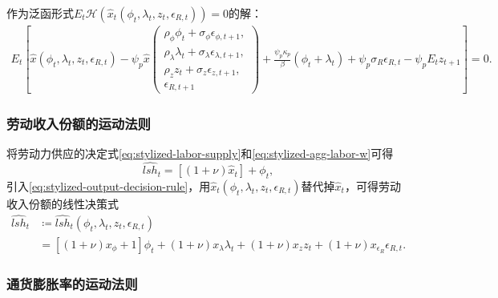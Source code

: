 作为泛函形式$E_{t} \mathcal{H} \left( \hat{x}_{t} \left( \phi_{t}, \lambda_{t}, z_{t}, \epsilon_{R,t} \right) \right) = 0$的解：
\begin{equation}
  \label{eq:stylized-output-functional-h}
\begin{split}
E_{t}
\left[
\hat{x} \left( \phi_{t}, \lambda_{t}, z_{t}, \epsilon_{R,t} \right)
- \psi_{p} \hat{x}
\begin{pmatrix}
  \rho_{\phi} \phi_{t} + \sigma_{\phi} \epsilon_{\phi, t+1}, \\
  \rho_{\lambda} \lambda_{t} + \sigma_{\lambda} \epsilon_{\lambda, t+1}, \\
  \rho_{z} z_{t} + \sigma_{z} \epsilon_{z,t+1}, \\
  \epsilon_{R,t+1}
\end{pmatrix}
+
\frac{\psi_{p} \kappa_{p}}{\beta} \left( \phi_{t} + \lambda_{t} \right)
+ \psi_{p} \sigma_{R} \epsilon_{R,t}
- \psi_{p} E_{t} z_{t+1}
\right] =0.
\end{split}
\end{equation}

\subsubsection{劳动收入份额的运动法则}
\label{sec:stylized-solution-lsh}
将劳动力供应的决定式\eqref{eq:stylized-labor-supply}和\eqref{eq:stylized-agg-labor-w}可得
\begin{equation*}
  \widehat{lsh}_{t} = \left[ \left( 1 + \nu \right) \hat{x}_{t} \right] + \phi_{t},
\end{equation*}
引入\eqref{eq:stylized-output-decision-rule}，用$\hat{x}_{t} \left( \phi_{t}, \lambda_{t}, z_{t}, \epsilon_{R,t} \right)$替代掉$\hat{x}_{t}$，可得劳动收入份额的线性决策式
\begin{equation}
  \label{eq:stylized-labor-share-decision-rule}
\begin{split}
  \widehat{lsh}_{t}  & \coloneqq \widehat{lsh}_{t} \left( \phi_{t}, \lambda_{t}, z_{t}, \epsilon_{R,t} \right) \\
  & = \left[ \left( 1 + \nu \right) x_{\phi} + 1 \right] \phi_{t}
  + \left( 1 + \nu \right) x_{\lambda} \lambda_{t}
  + \left( 1 + \nu \right) x_{z} z_{t}
  + \left( 1 + \nu \right) x_{\epsilon_{R}} \epsilon_{R,t}.
\end{split}
\end{equation}

\subsubsection{通货膨胀率的运动法则}
\label{sec:stylized-solution-inflation}

